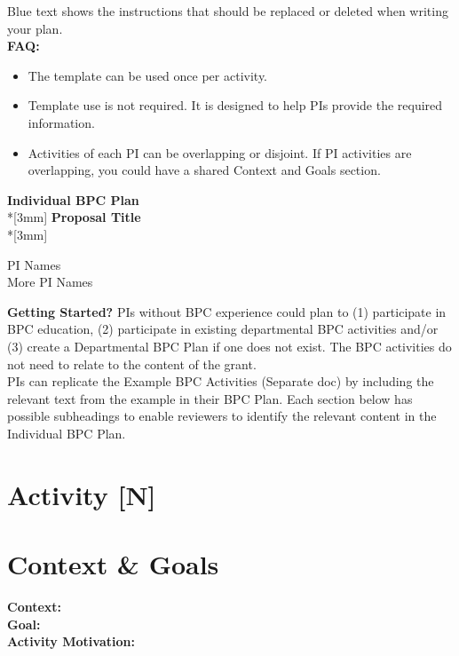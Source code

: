 \documentclass{proposalnsf}
\begin{document}
\color{Turquoise}
Blue text shows the instructions that should be replaced or deleted when writing your plan.\\

\textbf{FAQ:}
\begin{itemize}
    \item The template can be used once per activity.
    \item Template use is not required. It is designed to help PIs provide the required information.
    \item Activities of each PI can be overlapping or disjoint. If PI activities are overlapping, you could have a shared Context and Goals section. 
\end{itemize}

\begin{center}
\color{black}
{\Large{\bf Individual BPC Plan}}\\*[3mm]
\color{Turquoise}
{\bf Proposal Title} \\*[3mm]

PI Names \\
More PI Names

\end{center}

\color{Turquoise}
\noindent
\textbf{Getting Started?} PIs without BPC experience could plan to (1) participate in BPC education, (2) participate in existing departmental BPC activities and/or (3) create a Departmental BPC Plan if one does not exist. The BPC activities do not need to relate to the content of the grant. \\

PIs can replicate the Example BPC Activities (Separate doc) by including the relevant text from the example in their BPC Plan. Each section below has possible subheadings to enable reviewers to identify the relevant content in the Individual BPC Plan. 

\section*{Activity [N]}

\color{Black}
\section{Context \& Goals}
\textbf{Context:} \\ 
\textbf{Goal:} \\
\textbf{Activity Motivation:} \\
\end{document}
